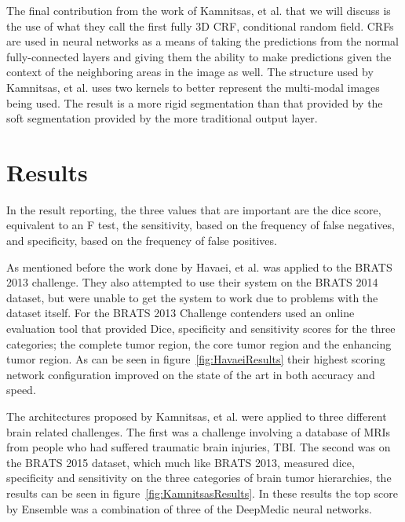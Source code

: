\documentclass{sig-alternate}
\begin{document}
The final contribution from the work of Kamnitsas, et al. that we will discuss is the use of what they call the first fully 3D CRF, conditional random field. CRFs are used in neural networks as a means of taking the predictions from the normal fully-connected layers and giving them the ability to make predictions given the context of the neighboring areas in the image as well. The structure used by Kamnitsas, et al. uses two kernels to better represent the multi-modal images being used. The result is a more rigid segmentation than that provided by the soft segmentation provided by the more traditional output layer.


\section{Results}
\label{sec:results}
In the result reporting, the three values that are important are the dice score, equivalent to an F test, the sensitivity, based on the frequency of false negatives, and specificity, based on the frequency of false positives.

As mentioned before the work done by Havaei, et al. was applied to the BRATS 2013 challenge. They also attempted to use their system on the BRATS 2014 dataset, but were unable to get the system to work due to problems with the dataset itself. For the BRATS 2013 Challenge contenders used an online evaluation tool that provided Dice, specificity and sensitivity scores for the three categories; the complete tumor region, the core tumor region and the enhancing tumor region. As can be seen in figure~\ref{fig:HavaeiResults} their highest scoring network configuration improved on the state of the art in both accuracy and speed.

\begin{figure*}
\centering
{}
\caption{Havaei, et al. best performnce versus previous state-of-the-arts~\cite{Havaei:2017}.}
\label{fig:HavaeiResults}
\end{figure*}

The architectures proposed by Kamnitsas, et al. were applied to three different brain related challenges. The first was a challenge involving a database of MRIs from people who had suffered traumatic brain injuries, TBI. The second was on the BRATS 2015 dataset, which much like BRATS 2013, measured dice, specificity and sensitivity on the three categories of brain tumor hierarchies, the results can be seen in figure~\ref{fig:KamnitsasResults}. In these results the top score by Ensemble was a combination of three of the DeepMedic neural networks.
\end{document}
